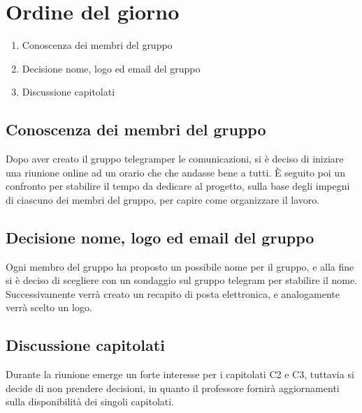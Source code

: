 \section{Ordine del giorno}
\begin{enumerate}
\item Conoscenza dei membri del gruppo
\item Decisione nome, logo ed email del gruppo
\item Discussione capitolati %
\end{enumerate}

\subsection{Conoscenza dei membri del gruppo}
Dopo aver creato il gruppo telegram\glo per le comunicazioni, si è deciso di iniziare una riunione online ad un orario che che andasse bene a tutti. È seguito poi un confronto per stabilire il tempo da dedicare al progetto, sulla base degli impegni di ciascuno dei membri del gruppo, per capire come organizzare il lavoro.
\subsection{Decisione nome, logo ed email del gruppo}
Ogni membro del gruppo ha proposto un possibile nome per il gruppo, e alla fine si è deciso di scegliere con un sondaggio sul gruppo telegram per stabilire il nome. Successivamente verrà creato un recapito di posta elettronica, e analogamente verrà scelto un logo.
\subsection{Discussione capitolati}
Durante la riunione emerge un forte interesse per i capitolati C2 e C3, tuttavia si decide di non prendere decisioni, in quanto il professore fornirà aggiornamenti sulla disponibilità dei singoli capitolati.
